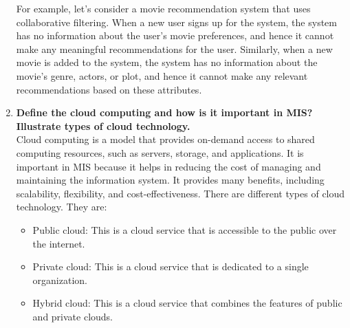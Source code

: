 \documentclass[12pt]{article}
\begin{document}
\begin{enumerate}
    For example, let's consider a movie recommendation system that uses collaborative filtering. When a new user signs up for the system, the system has no information about the user's movie preferences, and hence it cannot make any meaningful recommendations for the user. Similarly, when a new movie is added to the system, the system has no information about the movie's genre, actors, or plot, and hence it cannot make any relevant recommendations based on these attributes.
    \item {\bfseries Define the cloud computing and how is it important in MIS? Illustrate types of cloud technology.\\}
    Cloud computing is a model that provides on-demand access to shared computing resources, such as servers, storage, and applications. It is important in MIS because it helps in reducing the cost of managing and maintaining the information system. It provides many benefits, including scalability, flexibility, and cost-effectiveness. There are different types of cloud technology. They are:
    \begin{itemize}
        \item Public cloud: This is a cloud service that is accessible to the public over the internet.
        \item Private cloud: This is a cloud service that is dedicated to a single organization.
        \item Hybrid cloud: This is a cloud service that combines the features of public and private clouds.
    \end{itemize}




\end{enumerate}
\end{document}
